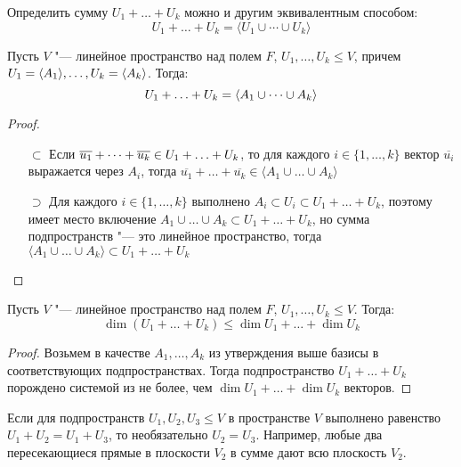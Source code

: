\begin{note}
	Определить сумму $U_1 + \dots + U_k$ можно и другим эквивалентным способом:
	\[U_1 + \dots + U_k = \langle U_1\cup\dotsb\cup U_k\rangle\]
\end{note}

\begin{proposition}
	Пусть $V$ "--- линейное пространство над полем $F$, $U_1, \dots, U_k \le V$, причем $U_1 = \langle A_1 \rangle, \dotsc, U_k = \langle A_k \rangle$. Тогда:
	\[U_1 + \dots \hm{+} U_k \hm{=} \langle A_1 \cup \dots \cup A_k\rangle\]
\end{proposition}

\begin{proof}~
	\begin{itemize}
		\item[$\subset$] Если $\overline{u_1} + \dots + \overline{u_k} \in U_1 + \dots \hm{+} U_k$, то для каждого $i \in \{1, \dotsc, k\}$ вектор $\overline{u_i}$ выражается через $A_i$, тогда $\overline{u_1} + \dots + \overline{u_k} \in \langle A_1 \cup \dots \cup A_k\rangle$
		
		\item[$\supset$] Для каждого $i \in \{1, \dots, k\}$ выполнено $A_i \subset U_i \subset U_1 + \dots + U_k$, поэтому имеет место включение $A_1 \cup \dots \cup A_k \subset U_1 + \dots + U_k$, но сумма подпространств "--- это линейное пространство, тогда $\langle A_1 \cup \dots \cup A_k\rangle \subset U_1 + \dots + U_k$\qedhere
	\end{itemize}
\end{proof}

\begin{corollary}
	Пусть $V$ "--- линейное пространство над полем $F$, $U_1, \dots, U_k \le V$. Тогда:
	\[\dim{(U_1 + \dots + U_k)} \le \dim{U_1} + \dots + \dim{U_k}\]
\end{corollary}

\begin{proof}
	Возьмем в качестве $A_1, \dotsc, A_k$ из утверждения выше базисы в соответствующих подпространствах. Тогда подпространство $U_1 + \dots + U_k$ порождено системой из не более, чем $\dim{U_1} + \dots + \dim{U_k}$ векторов.
\end{proof}

\begin{note}
	Если для подпространств $U_1, U_2, U_3 \le V$ в пространстве $V$ выполнено равенство $U_1 + U_2 = U_1 + U_3$, то необязательно $U_2 = U_3$. Например, любые два пересекающиеся прямые в плоскости $V_2$ в сумме дают всю плоскость $V_2$.
\end{note}

